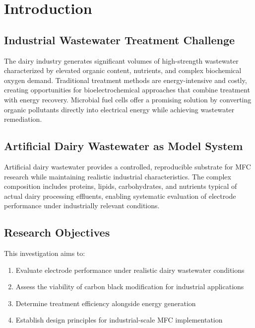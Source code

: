 \documentclass[12pt,a4paper]{article}
\begin{document}
\tableofcontents
\newpage

\section{Introduction}

\subsection{Industrial Wastewater Treatment Challenge}

The dairy industry generates significant volumes of high-strength wastewater characterized by elevated organic content, nutrients, and complex biochemical oxygen demand. Traditional treatment methods are energy-intensive and costly, creating opportunities for bioelectrochemical approaches that combine treatment with energy recovery. Microbial fuel cells offer a promising solution by converting organic pollutants directly into electrical energy while achieving wastewater remediation.

\subsection{Artificial Dairy Wastewater as Model System}

Artificial dairy wastewater provides a controlled, reproducible substrate for MFC research while maintaining realistic industrial characteristics. The complex composition includes proteins, lipids, carbohydrates, and nutrients typical of actual dairy processing effluents, enabling systematic evaluation of electrode performance under industrially relevant conditions.

\subsection{Research Objectives}

This investigation aims to:
\begin{enumerate}
    \item Evaluate electrode performance under realistic dairy wastewater conditions
    \item Assess the viability of carbon black modification for industrial applications
    \item Determine treatment efficiency alongside energy generation
    \item Establish design principles for industrial-scale MFC implementation
\end{enumerate}
\end{document}
